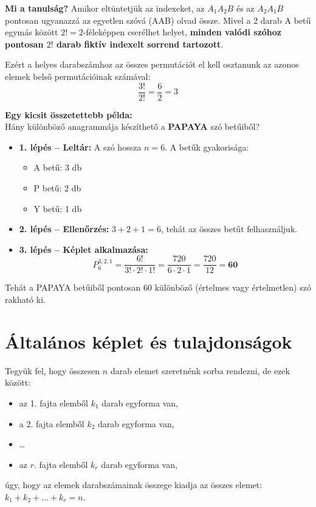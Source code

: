 \documentclass[11pt, a4paper]{article}
\begin{document}
\vspace{0.2cm}
\noindent\textbf{Mi a tanulság?}
Amikor eltüntetjük az indexeket, az $A_1 A_2 B$ és az $A_2 A_1 B$ pontosan ugyanazzá az egyetlen szóvá (AAB) olvad össze. Mivel a 2 darab A betű egymás között $2! = 2$-féleképpen cserélhet helyet, \textbf{minden valódi szóhoz pontosan $2!$ darab fiktív indexelt sorrend tartozott}.

Ezért a helyes darabszámhoz az összes permutációt el kell osztanunk az azonos elemek belső permutációinak számával:
\[
\frac{3!}{2!} = \frac{6}{2} = 3
\]


\vspace{0.3cm}
\noindent\textbf{Egy kicsit összetettebb példa:} \\
Hány különböző anagrammája készíthető a \textbf{PAPAYA} szó betűiből?
\begin{itemize}
    \item \textbf{1. lépés – Leltár:} A szó hossza $n = 6$. A betűk gyakorisága:
    \begin{itemize}
        \item A betű: 3 db
        \item P betű: 2 db
        \item Y betű: 1 db
    \end{itemize}
    \item \textbf{2. lépés – Ellenőrzés:} $3 + 2 + 1 = 6$, tehát az összes betűt felhasználjuk.
    \item \textbf{3. lépés – Képlet alkalmazása:}
    \[
    P_6^{3, 2, 1} = \frac{6!}{3! \cdot 2! \cdot 1!} = \frac{720}{6 \cdot 2 \cdot 1} = \frac{720}{12} = \mathbf{60}
    \]
\end{itemize}
Tehát a PAPAYA betűiből pontosan 60 különböző (értelmes vagy értelmetlen) szó rakható ki.


\section{Általános képlet és tulajdonságok}
Tegyük fel, hogy összesen $n$ darab elemet szeretnénk sorba rendezni, de ezek között:
\begin{itemize}
    \item az 1. fajta elemből $k_1$ darab egyforma van,
    \item a 2. fajta elemből $k_2$ darab egyforma van,
    \item \dots
    \item az $r$. fajta elemből $k_r$ darab egyforma van,
\end{itemize}
úgy, hogy az elemek darabszámainak összege kiadja az összes elemet: $k_1 + k_2 + \ldots + k_r = n$.
\end{document}

